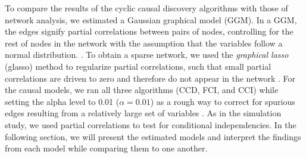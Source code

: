 \documentclass[twoside, 11pt]{article}
\begin{document}
 


To compare the results of the cyclic causal discovery algorithms with those of network analysis, we estimated a Gaussian graphical model (GGM). In a GGM, the edges signify partial correlations between pairs of nodes, controlling for the rest of nodes in the network with the assumption that the variables follow a normal distribution. \citep{epskamp_gaussian_2018}. To obtain a sparse network, we used the \textit{graphical lasso} (glasso) method to regularize partial correlations, such that small partial correlations are driven to zero and therefore do not appear in the network \citep{friedman_sparse_2008}. For the causal models, we ran all three algorithms (CCD, FCI, and CCI) while setting the alpha level to 0.01 ($\alpha = 0.01$) as a rough way to correct for spurious edges resulting from a relatively large set of variables \citep{zhang_kernel-based_2012}. As in the simulation study, we used partial correlations to test for conditional independencies. 
In the following section, we will present the estimated models and interpret the findings from each model while comparing them to one another.
\end{document}
